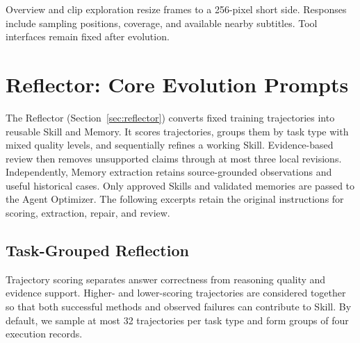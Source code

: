 Overview and clip exploration resize frames to a 256-pixel short side. Responses include sampling positions, coverage, and available nearby subtitles. Tool interfaces remain fixed after evolution.

\section{Reflector: Core Evolution Prompts}
\label{app:evolution_prompts}
\label{app:reflector}

The Reflector (Section~\ref{sec:reflector}) converts fixed training trajectories into reusable Skill and Memory. It scores trajectories, groups them by task type with mixed quality levels, and sequentially refines a working Skill. Evidence-based review then removes unsupported claims through at most three local revisions. Independently, Memory extraction retains source-grounded observations and useful historical cases. Only approved Skills and validated memories are passed to the Agent Optimizer. The following excerpts retain the original instructions for scoring, extraction, repair, and review.

\subsection{Task-Grouped Reflection}

Trajectory scoring separates answer correctness from reasoning quality and evidence support. Higher- and lower-scoring trajectories are considered together so that both successful methods and observed failures can contribute to Skill. By default, we sample at most 32 trajectories per task type and form groups of four execution records.

